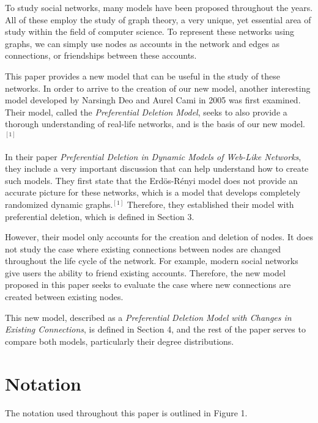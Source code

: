 \documentclass[final,3p,times,twocolumn]{elsarticle}
\begin{document}
To study social networks, many models have been proposed throughout the years. All of these employ the study of graph theory, a very unique, yet essential area of study within the field of computer science. To represent these networks using graphs, we can simply use nodes as accounts in the network and edges as connections, or friendships between these accounts.

This paper provides a new model that can be useful in the study of these networks. In order to arrive to the creation of our new model, another interesting model developed by Narsingh Deo and Aurel Cami in 2005 was first examined. Their model, called the \textit{Preferential Deletion Model}, seeks to also provide a thorough understanding of real-life networks, and is the basis of our new model.$^{[1]}$

In their paper \textit{Preferential Deletion in Dynamic Models of Web-Like Networks}, they include a very important discussion that can help understand how to create such models. They first state that the Erdös-Rényi model does not provide an accurate picture for these networks, which is a model that develops completely randomized dynamic graphs.$^{[1]}$ Therefore, they established their model with preferential deletion, which is defined in Section 3.

However, their model only accounts for the creation and deletion of nodes. It does not study the case where existing connections between nodes are changed throughout the life cycle of the network. For example, modern social networks give users the ability to friend existing accounts. Therefore, the new model proposed in this paper seeks to evaluate the case where new connections are created between existing nodes.

This new model, described as a \textit{Preferential Deletion Model with Changes in Existing Connections}, is defined in Section 4, and the rest of the paper serves to compare both models, particularly their degree distributions.

\section{Notation}
\label{S:2}

The notation used throughout this paper is outlined in Figure 1.
\end{document}
